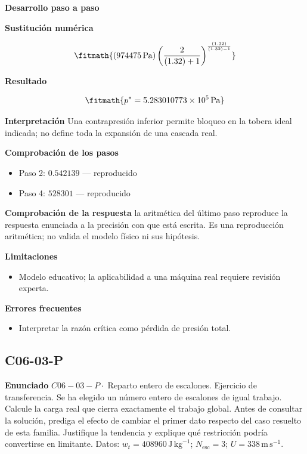 \documentclass[10pt,openany]{book}
\begin{document}
\noindent\textbf{Desarrollo paso a paso}



\noindent\textbf{Sustitución numérica}

\[
\fitmath{\left(974475\,\mathrm{Pa}\right) \left(\frac{2}{\left(1.32\right) + 1}\right)^{\frac{\left(1.32\right)}{\left(1.32\right) - 1}}}
\]

\noindent\textbf{Resultado}

\[
\fitmath{p^{*}=5.283010773\times10^{5}\,\mathrm{Pa}}
\]

\noindent\textbf{Interpretación}
Una contrapresión inferior permite bloqueo en la tobera ideal indicada; no define toda la expansión de una cascada real.

\noindent\textbf{Comprobación de los pasos}
\begin{itemize}
\item Paso 2: $0.542139$ — reproducido
\item Paso 4: $528301$ — reproducido
\end{itemize}

\noindent\textbf{Comprobación de la respuesta} la aritmética del último paso reproduce la respuesta enunciada a la precisión con que está escrita. Es una reproducción aritmética; no valida el modelo físico ni sus hipótesis.

\noindent\textbf{Limitaciones}
\begin{itemize}
\item Modelo educativo; la aplicabilidad a una máquina real requiere revisión experta.
\end{itemize}

\noindent\textbf{Errores frecuentes}
\begin{itemize}
\item Interpretar la razón crítica como pérdida de presión total.
\end{itemize}
\subsection*{C06-03-P}

\noindent\textbf{Enunciado}
\(C06-03-P \cdot\) Reparto entero de escalones. Ejercicio de transferencia. Se ha elegido un número entero de escalones de igual trabajo. Calcule la carga real que cierra exactamente el trabajo global. Antes de consultar la solución, prediga el efecto de cambiar el primer dato respecto del caso resuelto de esta familia. Justifique la tendencia y explique qué restricción podría convertirse en limitante. Datos: \(w_t=408960\, \mathrm{J}\,\mathrm{kg}^{-1}\); \(N_{\mathrm{esc}}=3\); \(U=338\, \mathrm{m}\,\mathrm{s}^{-1}\).
\end{document}
